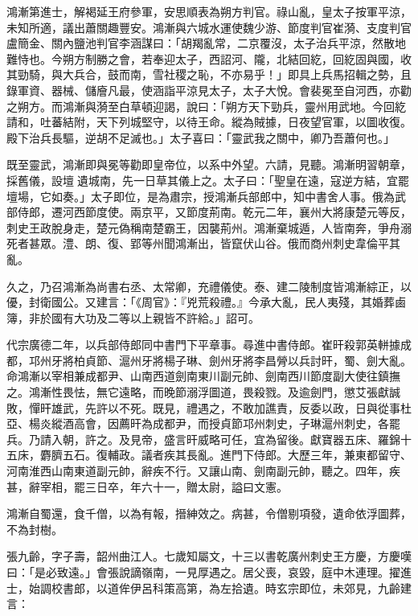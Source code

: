 \begin{pinyinscope}
 鴻漸第進士，解褐延王府參軍，安思順表為朔方判官。祿山亂，皇太子按軍平涼，未知所適，議出蕭關趣豐安。鴻漸與六城水運使魏少游、節度判官崔漪、支度判官盧簡金、關內鹽池判官李涵謀曰：「胡羯亂常，二京覆沒，太子治兵平涼，然散地難恃也。今朔方制勝之會，若奉迎太子，西詔河、隴，北結回紇，回紇固與國，收其勁騎，與大兵合，鼓而南，雪社稷之恥，不亦易乎！」即具上兵馬招輯之勢，且錄軍資、器械、儲廥凡最，使涵詣平涼見太子，太子大悅。會裴冕至自河西，亦勸之朔方。而鴻漸與漪至白草頓迎謁，說曰：「朔方天下勁兵，靈州用武地。今回紇請和，吐蕃結附，天下列城堅守，以待王命。縱為賊據，日夜望官軍，以圖收復。殿下治兵長驅，逆胡不足滅也。」太子喜曰：「靈武我之關中，卿乃吾蕭何也。」



 既至靈武，鴻漸即與冕等勸即皇帝位，以系中外望。六請，見聽。鴻漸明習朝章，採舊儀，設壇遺城南，先一日草其儀上之。太子曰：「聖皇在遠，寇逆方結，宜罷壇場，它如奏。」太子即位，是為肅宗，授鴻漸兵部郎中，知中書舍人事。俄為武部侍郎，遷河西節度使。兩京平，又節度荊南。乾元二年，襄州大將康楚元等反，刺史王政脫身走，楚元偽稱南楚霸王，因襲荊州。鴻漸棄城遁，人皆南奔，爭舟溺死者甚眾。澧、朗、復、郢等州聞鴻漸出，皆竄伏山谷。俄而商州刺史韋倫平其亂。



 久之，乃召鴻漸為尚書右丞、太常卿，充禮儀使。泰、建二陵制度皆鴻漸綜正，以優，封衛國公。又建言：「《周官》：『兇荒殺禮。』今承大亂，民人夷殘，其婚葬鹵簿，非於國有大功及二等以上親皆不許給。」詔可。



 代宗廣德二年，以兵部侍郎同中書門下平章事。尋進中書侍郎。崔旰殺郭英軿據成都，邛州牙將柏貞節、滬州牙將楊子琳、劍州牙將李昌膋以兵討旰，蜀、劍大亂。命鴻漸以宰相兼成都尹、山南西道劍南東川副元帥、劍南西川節度副大使往鎮撫之。鴻漸性畏怯，無它遠略，而晚節溺浮圖道，畏殺戮。及逾劍門，懲艾張獻誠敗，憚旰雄武，先許以不死。既見，禮遇之，不敢加譙責，反委以政，日與從事杜亞、楊炎縱酒高會，因薦旰為成都尹，而授貞節邛州刺史，子琳滬州刺史，各罷兵。乃請入朝，許之。及見帝，盛言旰威略可任，宜為留後。獻寶器五床、羅錦十五床，麝臍五石。復輔政。議者疾其長亂。進門下侍郎。大歷三年，兼東都留守、河南淮西山南東道副元帥，辭疾不行。又讓山南、劍南副元帥，聽之。四年，疾甚，辭宰相，罷三日卒，年六十一，贈太尉，謚曰文憲。



 鴻漸自蜀還，食千僧，以為有報，搢紳效之。病甚，令僧剔項發，遺命依浮圖葬，不為封樹。



 張九齡，字子壽，韶州曲江人。七歲知屬文，十三以書乾廣州刺史王方慶，方慶嘆曰：「是必致遠。」會張說謫嶺南，一見厚遇之。居父喪，哀毀，庭中木連理。擢進士，始調校書郎，以道侔伊呂科策高第，為左拾遺。時玄宗即位，未郊見，九齡建言：




\end{pinyinscope}
